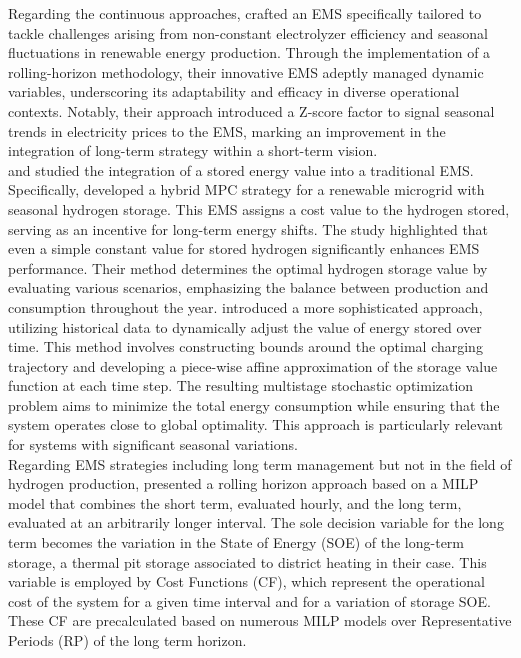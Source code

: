 Regarding the continuous approaches, \cite{abomazid_optimal_2022} crafted an EMS specifically tailored to tackle challenges arising from non-constant electrolyzer efficiency and seasonal fluctuations in renewable energy production. Through the implementation of a rolling-horizon methodology, their innovative EMS adeptly managed dynamic variables, underscoring its adaptability and efficacy in diverse operational contexts. Notably, their approach introduced a Z-score factor to signal seasonal trends in electricity prices to the EMS, marking an improvement in the integration of long-term strategy within a short-term vision.
\\
\cite{darivianakis_data-driven_2017} and \cite{thaler_hybrid_2023} studied the integration of a stored energy value into a traditional EMS. Specifically, \cite{thaler_hybrid_2023} developed a hybrid MPC strategy for a renewable microgrid with seasonal hydrogen storage. This EMS assigns a cost value to the hydrogen stored, serving as an incentive for long-term energy shifts. The study highlighted that even a simple constant value for stored hydrogen significantly enhances EMS performance. Their method determines the optimal hydrogen storage value by evaluating various scenarios, emphasizing the balance between production and consumption throughout the year.
\cite{darivianakis_data-driven_2017} introduced a more sophisticated approach, utilizing historical data to dynamically adjust the value of energy stored over time. This method involves constructing bounds around the optimal charging trajectory and developing a piece-wise affine approximation of the storage value function at each time step. The resulting multistage stochastic optimization problem aims to minimize the total energy consumption while ensuring that the system operates close to global optimality. This approach is particularly relevant for systems with significant seasonal variations.
\\
Regarding EMS strategies including long term management but not in the field of hydrogen production, \cite{cuisinier_new_2022,cuisinier_impact_2023} presented a rolling horizon approach based on a MILP model that combines the short term, evaluated hourly, and the long term, evaluated at an arbitrarily longer interval.
The sole decision variable for the long term becomes the variation in the State of Energy (SOE) of the long-term storage, a thermal pit storage associated to district heating in their case. This variable is employed by Cost Functions (CF), which represent the operational cost of the system for a given time interval and for a variation of storage SOE. These CF are precalculated based on numerous MILP models over Representative Periods (RP) of the long term horizon.
\\

